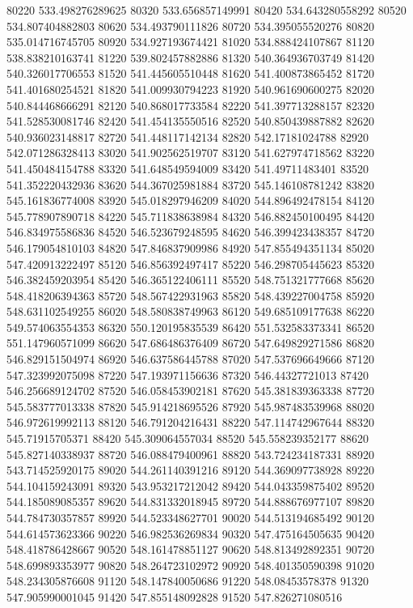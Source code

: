 {80220 533.498276289625
80320 533.656857149991
80420 534.643280558292
80520 534.807404882803
80620 534.493790111826
80720 534.395055520276
80820 535.014716745705
80920 534.927193674421
81020 534.888424107867
81120 538.838210163741
81220 539.802457882886
81320 540.364936703749
81420 540.326017706553
81520 541.445605510448
81620 541.400873865452
81720 541.401680254521
81820 541.009930794223
81920 540.961690600275
82020 540.844468666291
82120 540.868017733584
82220 541.397713288157
82320 541.528530081746
82420 541.454135550516
82520 540.850439887882
82620 540.936023148817
82720 541.448117142134
82820 542.17181024788
82920 542.071286328413
83020 541.902562519707
83120 541.627974718562
83220 541.450484154788
83320 541.648549594009
83420 541.49711483401
83520 541.352220432936
83620 544.367025981884
83720 545.146108781242
83820 545.161836774008
83920 545.018297946209
84020 544.896492478154
84120 545.778907890718
84220 545.711838638984
84320 546.882450100495
84420 546.834975586836
84520 546.523679248595
84620 546.399423438357
84720 546.179054810103
84820 547.846837909986
84920 547.855494351134
85020 547.420913222497
85120 546.856392497417
85220 546.298705445623
85320 546.382459203954
85420 546.365122406111
85520 548.751321777668
85620 548.418206394363
85720 548.567422931963
85820 548.439227004758
85920 548.631102549255
86020 548.580838749963
86120 549.685109177638
86220 549.574063554353
86320 550.120195835539
86420 551.532583373341
86520 551.147960571099
86620 547.686486376409
86720 547.649829271586
86820 546.829151504974
86920 546.637586445788
87020 547.537696649666
87120 547.323992075098
87220 547.193971156636
87320 546.44327721013
87420 546.256689124702
87520 546.058453902181
87620 545.381839363338
87720 545.583777013338
87820 545.914218695526
87920 545.987483539968
88020 546.972619992113
88120 546.791204216431
88220 547.114742967644
88320 545.71915705371
88420 545.309064557034
88520 545.558239352177
88620 545.827140338937
88720 546.088479400961
88820 543.724234187331
88920 543.714525920175
89020 544.261140391216
89120 544.369097738928
89220 544.104159243091
89320 543.953217212042
89420 544.043359875402
89520 544.185089085357
89620 544.831332018945
89720 544.888676977107
89820 544.784730357857
89920 544.523348627701
90020 544.513194685492
90120 544.614573623366
90220 546.982536269834
90320 547.475164505635
90420 548.418786428667
90520 548.161478851127
90620 548.813492892351
90720 548.699893353977
90820 548.264723102972
90920 548.401350590398
91020 548.234305876608
91120 548.147840050686
91220 548.08453578378
91320 547.905990001045
91420 547.855148092828
91520 547.826271080516
}
